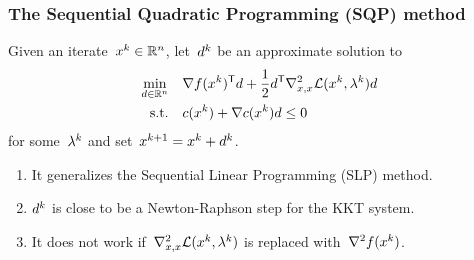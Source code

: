 \documentclass{polyu-presentation}
\newcommand{\con}[1][]{c\ifthenelse{\equal{#1}{}}{}{_{#1}}}
\newcommand{\iter}[1][]{x\ifthenelse{\equal{#1}{}}{}{^{#1}}}
\newcommand{\lag}[1][]{\mathcal{L}\ifthenelse{\equal{#1}{}}{}{^{#1}}}
\newcommand{\lm}[1][]{\lambda\ifthenelse{\equal{#1}{}}{}{^{#1}}}
\newcommand{\obj}{f}
\newcommand{\step}[1][]{d\ifthenelse{\equal{#1}{}}{}{^{#1}}}
\begin{document}
\begin{frame}
    \frametitle{The Sequential Quadratic Programming (SQP) method}
    
	Given an iterate~$\iter[k] \in \R^n$, let~$\step[k]$ be an approximate solution to
    \begin{align*}
        \min_{\step \in \R^n}   & \quad \nabla \obj(\iter[k])^{\T} \step + \frac{1}{2} \step^{\T} \nabla_{x, x}^2 \lag(\iter[k], \lm[k]) \step\\
        \text{s.t.}             & \quad \con(\iter[k]) + \nabla \con(\iter[k]) \step \le 0
    \end{align*}
    for some~$\lm[k]$ and set~$\iter[k + 1] = \iter[k] + \step[k]$.
    
    \medskip

    \begin{block}{}
        \begin{enumerate}
            \item It generalizes the \alert{Sequential Linear Programming} (SLP) method.
            \item $\step[k]$ is close to be a \alert{Newton-Raphson} step for the KKT system.
            \item It does \alert{not} work if~$\nabla_{x, x}^2 \lag(\iter[k], \lm[k])$ is replaced with~$\nabla^2 \obj(\iter[k])$.
        \end{enumerate}
    \end{block}
\end{frame}
\end{document}

